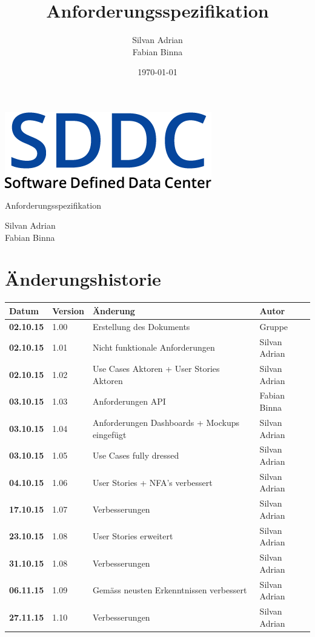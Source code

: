\documentclass[11pt]{scrartcl}
\title{Anforderungsspezifikation}
\author{Silvan Adrian \\ Fabian Binna}
\date{\today{}}
\begin{document}
\def\arraystretch{1.5}
\begin{titlepage}
\begin{center}
\vspace{10em}
\includegraphics[scale=2]{SDDC}
\vspace{10em}
\end{center}
\begin{center}
\huge {Anforderungsspezifikation}
\end{center}
\begin{center}
\vspace{10em}
\LARGE {Silvan Adrian} \\
\LARGE {Fabian Binna}
\end{center}

\end{titlepage}

\newpage
\section{Änderungshistorie}
\begin{tabularx}{\linewidth}{l l X l}
\textbf{Datum} & \textbf{Version} & \textbf{Änderung}  & \textbf{Autor} \\
\hline
\textbf{02.10.15} & 1.00 & Erstellung des Dokuments & Gruppe \\
\textbf{02.10.15} & 1.01 & Nicht funktionale Anforderungen & Silvan Adrian\\
\textbf{02.10.15} & 1.02 & Use Cases Aktoren + User Stories Aktoren & Silvan 
Adrian\\
\textbf{03.10.15} & 1.03 & Anforderungen API & Fabian Binna\\
\textbf{03.10.15} & 1.04 & Anforderungen Dashboards + Mockups eingefügt & Silvan 
Adrian\\
\textbf{03.10.15} & 1.05 & Use Cases fully dressed & Silvan Adrian\\
\textbf{04.10.15} & 1.06 & User Stories + NFA's verbessert & Silvan Adrian\\
\textbf{17.10.15} & 1.07 & Verbesserungen & Silvan Adrian\\
\textbf{23.10.15} & 1.08 & User Stories erweitert & Silvan Adrian\\
\textbf{31.10.15} & 1.08 & Verbesserungen & Silvan Adrian\\
\textbf{06.11.15} & 1.09 & Gemäss neusten Erkenntnissen verbessert & Silvan Adrian\\
\textbf{27.11.15} & 1.10 & Verbesserungen & Silvan Adrian\\
\end{tabularx}
\end{document}
